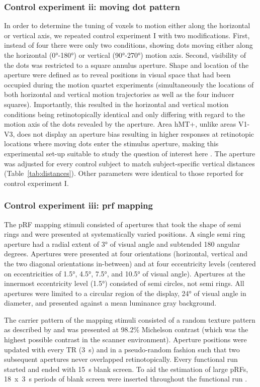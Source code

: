 \subsubsection{Control experiment ii: moving dot pattern}
In order to determine the tuning of voxels to motion either along the horizontal or vertical axis, we repeated control experiment I with two modifications. First, instead of four there were only two conditions, showing dots moving either along the horizontal (0°-180°) or vertical (90°-270°) motion axis. Second, visibility of the dots was restricted to a square annulus aperture. Shape and location of the aperture were defined as to reveal positions in visual space that had been occupied during the motion quartet experiments (simultaneously the locations of both horizontal and vertical motion trajectories as well as the four inducer squares). Importantly, this resulted in the horizontal and vertical motion conditions being retinotopically identical and only differing with regard to the motion axis of the dots revealed by the aperture. Area hMT+, unlike areas V1-V3, does not display an aperture bias resulting in higher responses at retinotopic locations where moving dots enter the stimulus aperture, making this experimental set-up suitable to study the question of interest here \parencite{Wang2014}. The aperture was adjusted for every control subject to match subject-specific vertical distances (Table~\ref{tab:distances}). Other parameters were identical to those reported for control experiment I.

\subsubsection{Control experiment iii: prf mapping}
The pRF mapping stimuli consisted of apertures that took the shape of semi rings and were presented at systematically varied positions. A single semi ring aperture had a radial extent of 3° of visual angle and subtended 180 angular degrees. Apertures were presented at four orientations (horizontal, vertical and the two diagonal orientations in-between) and at four eccentricity levels (centered on eccentricities of 1.5°, 4.5°, 7.5°, and 10.5° of visual angle). Apertures at the innermost eccentricity level (1.5°) consisted of semi circles, not semi rings. All apertures were limited to a circular region of the display, 24° of visual angle in diameter, and presented against a mean luminance gray background.

The carrier pattern of the mapping stimuli consisted of a random texture pattern as described by \cite{Kolster2010} and was presented at 98.2\% Michelson contrast (which was the highest possible contrast in the scanner environment). Aperture positions were updated with every TR (3~s) and in a pseudo-random fashion such that two subsequent apertures never overlapped retinotopically. Every functional run started and ended with 15~s blank screen. To aid the estimation of large pRFs, 18~x~3~s periods of blank screen were inserted throughout the functional run \parencite{Amano2009}.

